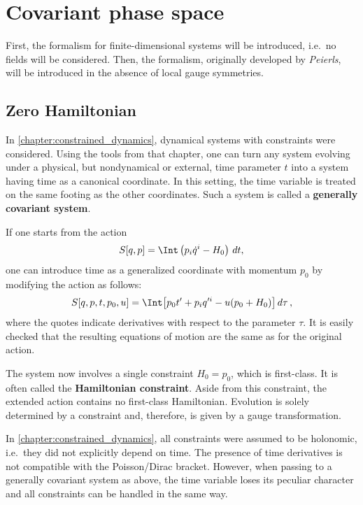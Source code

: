 \section{Covariant phase space}

    First, the formalism for finite-dimensional systems will be introduced, i.e.~no fields will be considered. Then, the formalism, originally developed by \textit{Peierls}, will be introduced in the absence of local gauge symmetries.

\subsection{Zero Hamiltonian}

    In \cref{chapter:constrained_dynamics}, dynamical systems with constraints were considered. Using the tools from that chapter, one can turn any system evolving under a physical, but nondynamical or external, time parameter $t$ into a system having time as a canonical coordinate. In this setting, the time variable is treated on the same footing as the other coordinates. Such a system is called a \textbf{generally covariant system}.

    If one starts from the action
    \begin{gather}
        S[q,p] = \Int\left(p_i\dot{q}^i-H_0\right)\,dt,
    \end{gather}
    one can introduce time as a generalized coordinate with momentum $p_0$ by modifying the action as follows:
    \begin{gather}
        S[q,p,t,p_0,u] = \Int\bigl[p_0t'+p_iq'^i-u(p_0+H_0)\bigr]\,d\tau\,,
    \end{gather}
    where the quotes indicate derivatives with respect to the parameter $\tau$. It is easily checked that the resulting equations of motion are the same as for the original action.

    The system now involves a single constraint $H_0=p_0$, which is first-class. It is often called the \textbf{Hamiltonian constraint}. Aside from this constraint, the extended action contains no first-class Hamiltonian. Evolution is solely determined by a constraint and, therefore, is given by a gauge transformation.

    \begin{remark}[Nonholonomicity]
        In \cref{chapter:constrained_dynamics}, all constraints were assumed to be holonomic, i.e.~they did not explicitly depend on time. The presence of time derivatives is not compatible with the Poisson/Dirac bracket. However, when passing to a generally covariant system as above, the time variable loses its peculiar character and all constraints can be handled in the same way.
    \end{remark}


